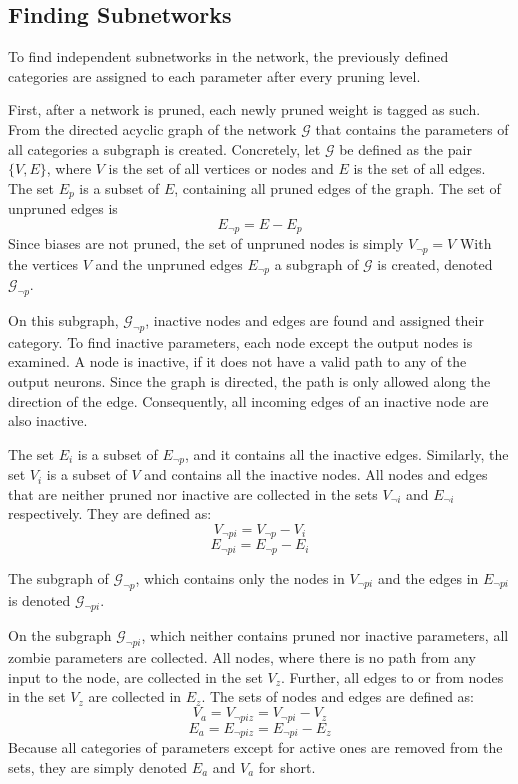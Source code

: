 \subsection{Finding Subnetworks}\label{sec:FindSubnet}
To find independent subnetworks in the network, the previously defined categories are assigned to each parameter after every pruning level.

First, after a network is pruned, each newly pruned weight is tagged as such.
From the directed acyclic graph of the network $\mathcal{G}$ that contains the parameters of all categories a subgraph is created.
Concretely, let $\mathcal{G}$ be defined as the pair $\{V, E\}$, where $V$ is the set of all vertices or nodes and $E$ is the set of all edges.
The set $E_p$ is a subset of $E$, containing all pruned edges of the graph.
The set of unpruned edges is
\[ E_{\neg p} = E - E_p \]
Since biases are not pruned, the set of unpruned nodes is simply $V_{\neg p} = V$
With the vertices $V$ and the unpruned edges $E_{\neg p}$ a subgraph of $\mathcal{G}$ is created, denoted $\mathcal{G}_{\neg p}$.

On this subgraph, $\mathcal{G}_{\neg p}$, inactive nodes and edges are found and assigned their category.
To find inactive parameters, each node except the output nodes is examined.
A node is inactive, if it does not have a valid path to any of the output neurons.
Since the graph is directed, the path is only allowed along the direction of the edge.
Consequently, all incoming edges of an inactive node are also inactive.

The set $E_i$ is a subset of $E_{\neg p}$, and it contains all the inactive edges.
Similarly, the set $V_i$ is a subset of $V$ and contains all the inactive nodes.
All nodes and edges that are neither pruned nor inactive are collected in the sets $V_{\neg i}$ and $E_{\neg i}$ respectively.
They are defined as:
\[ V_{\neg pi} = V_{\neg p} - V_i \]
\[ E_{\neg pi} = E_{\neg p} - E_i \]

The subgraph of $\mathcal{G}_{\neg p}$, which contains only the nodes in $V_{\neg pi}$ and the edges in $E_{\neg pi}$ is denoted $\mathcal{G}_{\neg pi}$.

On the subgraph $\mathcal{G}_{\neg pi}$, which neither contains pruned nor inactive parameters, all zombie parameters are collected.
All nodes, where there is no path from any input to the node, are collected in the set $V_z$.
Further, all edges to or from nodes in the set $V_z$ are collected in $E_z$.
The sets of nodes and edges are defined as:
\[ V_a = V_{\neg piz} = V_{\neg pi} - V_z \]
\[ E_a = E_{\neg piz} = E_{\neg pi} - E_z \]
Because all categories of parameters except for active ones are removed from the sets, they are simply denoted $E_a$ and $V_a$ for short.

